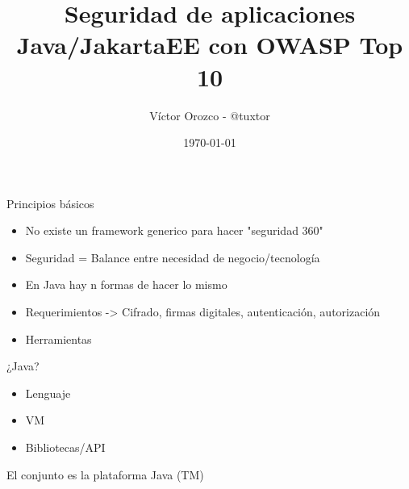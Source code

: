 \documentclass[aspectratio=169]{beamer}
\title{Seguridad de aplicaciones Java/JakartaEE con OWASP Top 10}
\author{Víctor Orozco - @tuxtor}
\institute{Academik}
\date{\today}
\begin{document}
{
    \frame{\titlepage}
}

\begin{frame}{Principios básicos}
	\begin{itemize}
	\item No existe un framework generico para hacer "seguridad 360"
	\item Seguridad = Balance entre necesidad de negocio/tecnología
	\item En Java hay n formas de hacer lo mismo
	\item Requerimientos -> Cifrado, firmas digitales, autenticación, autorización
	\item Herramientas
\end{itemize}
\end{frame}


\begin{frame}[fragile]{¿Java?}
    \begin{itemize}
        \item Lenguaje
        \item VM
        \item Bibliotecas/API
    \end{itemize}
    
    El conjunto es la plataforma Java \pause(TM)
    
\end{frame}
\end{document}
